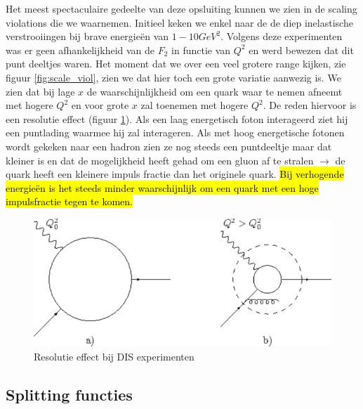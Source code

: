 \documentclass[../main.tex]{subfiles}
\begin{document}
Het meest spectaculaire gedeelte van deze opsluiting kunnen we zien in de scaling violations die we waarnemen. Initieel keken we enkel naar de de diep inelastische verstrooiingen bij brave energieën van $1-10GeV^2$. Volgens deze experimenten was er geen afhankelijkheid van de $F_2$ in functie van $Q^2$ en werd bewezen dat dit punt deeltjes waren. Het moment dat we over een veel grotere range kijken, zie figuur \ref{fig:scale_viol}, zien we dat hier toch een grote variatie aanwezig is. We zien dat bij lage $x$ de waarschijnlijkheid om een quark waar te nemen afneemt met hogere $Q^2$ en voor grote $x$ zal toenemen met hogere $Q^2$. De reden hiervoor is een resolutie effect (figuur \ref{fig:dis_resolutie}). Als een laag energetisch foton interageerd ziet hij een puntlading waarmee hij zal interageren. Als met hoog energetische fotonen wordt gekeken naar een hadron zien ze nog steeds een puntdeeltje maar dat kleiner is en dat de mogelijkheid heeft gehad om een gluon af te stralen $\rightarrow$ de quark heeft een kleinere impuls fractie dan het originele quark. \hl{Bij verhogende energieën is het steeds minder waarschijnlijk om een quark met een hoge impulsfractie tegen te komen.}

\begin{figure}[h]
    \centering
    \includegraphics[width=0.8\linewidth]{QCD/resolutie.png}
    \caption{Resolutie effect bij DIS experimenten}%
    \label{fig:dis_resolutie}
\end{figure}

\subsection{Splitting functies}%
\label{sub:splitting_functies}
\end{document}
